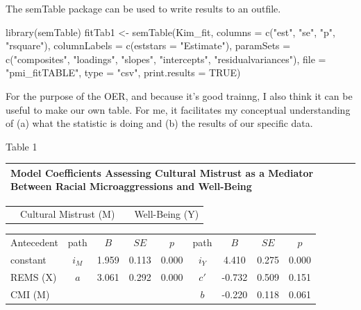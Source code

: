 \documentclass[
  english,
]{book}
\newenvironment{Shaded}{\begin{snugshade}}{\end{snugshade}}
\newcommand{\AttributeTok}[1]{\textcolor[rgb]{0.77,0.63,0.00}{#1}}
\newcommand{\ConstantTok}[1]{\textcolor[rgb]{0.00,0.00,0.00}{#1}}
\newcommand{\FunctionTok}[1]{\textcolor[rgb]{0.00,0.00,0.00}{#1}}
\newcommand{\NormalTok}[1]{#1}
\newcommand{\OtherTok}[1]{\textcolor[rgb]{0.56,0.35,0.01}{#1}}
\newcommand{\StringTok}[1]{\textcolor[rgb]{0.31,0.60,0.02}{#1}}
\begin{document}
The semTable package can be used to write results to an outfile.

\begin{Shaded}
\begin{Highlighting}[]
\FunctionTok{library}\NormalTok{(semTable)}
\NormalTok{fitTab1 }\OtherTok{\textless{}{-}} \FunctionTok{semTable}\NormalTok{(Kim\_fit, }\AttributeTok{columns =} \FunctionTok{c}\NormalTok{(}\StringTok{"est"}\NormalTok{, }\StringTok{"se"}\NormalTok{, }\StringTok{"p"}\NormalTok{, }\StringTok{"rsquare"}\NormalTok{),  }\AttributeTok{columnLabels =} \FunctionTok{c}\NormalTok{(}\AttributeTok{eststars =} \StringTok{"Estimate"}\NormalTok{), }\AttributeTok{paramSets =} \FunctionTok{c}\NormalTok{(}\StringTok{"composites"}\NormalTok{, }\StringTok{"loadings"}\NormalTok{, }\StringTok{"slopes"}\NormalTok{, }\StringTok{"intercepts"}\NormalTok{, }\StringTok{"residualvariances"}\NormalTok{), }\AttributeTok{file =} \StringTok{"pmi\_fitTABLE"}\NormalTok{, }\AttributeTok{type =} \StringTok{"csv"}\NormalTok{, }\AttributeTok{print.results =} \ConstantTok{TRUE}\NormalTok{)}
\end{Highlighting}
\end{Shaded}

For the purpose of the OER, and because it's good trainng, I also think it can be useful to make our own table. For me, it facilitates my conceptual understanding of (a) what the statistic is doing and (b) the results of our specific data.

Table 1

\begin{longtable}[]{@{}
  >{\raggedright\arraybackslash}p{}@{}}
\toprule
Model Coefficients Assessing Cultural Mistrust as a Mediator Between Racial Microaggressions and Well-Being \\
\midrule
\endhead
\bottomrule
\end{longtable}

\begin{longtable}[]{@{}lccc@{}}
\toprule
& & & \\
\midrule
\endhead
& Cultural Mistrust (M) & & Well-Being (Y) \\
\bottomrule
\end{longtable}

\begin{longtable}[]{@{}lcccccccc@{}}
\toprule
& & & & & & & & \\
\midrule
\endhead
Antecedent & path & \(B\) & \(SE\) & \(p\) & path & \(B\) & \(SE\) & \(p\) \\
constant & \(i_{M}\) & 1.959 & 0.113 & 0.000 & \(i_{Y}\) & 4.410 & 0.275 & 0.000 \\
REMS (X) & \(a\) & 3.061 & 0.292 & 0.000 & \(c'\) & -0.732 & 0.509 & 0.151 \\
CMI (M) & & & & & \(b\) & -0.220 & 0.118 & 0.061 \\
\bottomrule
\end{longtable}
\end{document}
